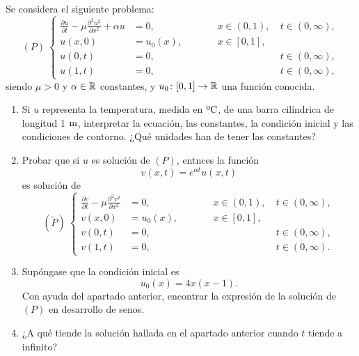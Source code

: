 \documentclass[11pt]{report}
\begin{document}
\begin{exercise}[Junio de 2024]
    Se considera el siguiente problema:
    \[(P) \ \left\{\begin{alignedat}{4}
    \frac{\partial u}{\partial t}-\mu\frac{\partial^2u^2}{\partial x^2}+\alpha u &= 0, & \qquad & x \in (0,1), \ & t \in (0,\infty), \\
    u(x,0) &= u_0(x), & \qquad & x \in [0,1], & \\
    u(0,t) &= 0, & \qquad & \ & t \in (0,\infty), \\
    u(1,t) &= 0, & \qquad & \ & t \in (0,\infty),
    \end{alignedat}\right.\]
    siendo $\mu >0$ y $\alpha\in\mathbb R$ constantes, y $u_0\colon[0,1]\to\mathbb R$ una función conocida.
    \begin{enumerate}
    \item Si $u$ representa la temperatura, medida en $\textup{ºC}$, de una barra cilíndrica de longitud 1 $\textup{m}$, interpretar la ecuación, las constantes, la condición inicial y las condiciones de contorno. ¿Qué unidades han de tener las constantes?
    \item Probar que si $u$ es solución de $(P)$, entnces la función
    \[v(x,t) = e^{\alpha t}u(x,t)\]
    es solución de
    \[(\widetilde{P}) \ \left\{\begin{alignedat}{4}
    \frac{\partial v}{\partial t}-\mu\frac{\partial^2v^2}{\partial x^2} &= 0, & \qquad & x \in (0,1), \ & t \in (0,\infty), \\
    v(x,0) &= u_0(x), & \qquad & x \in [0,1], & \\
    v(0,t) &= 0, & \qquad & \ & t \in (0,\infty), \\
    v(1,t) &= 0, & \qquad & \ & t \in (0,\infty).
    \end{alignedat}\right.\]
    \item Supóngase que la condición inicial es
    \[u_0(x) = 4x(x-1).\]
    Con ayuda del apartado anterior, encontrar la expresión de la solución de $(P)$ en desarrollo de senos.
    \item ¿A qué tiende la solución hallada en el apartado anterior cuando $t$ tiende a infinito?
\end{enumerate}
\end{exercise}
\end{document}
